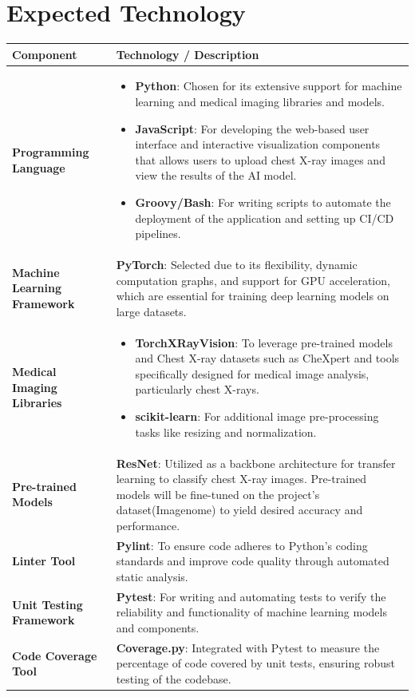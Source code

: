\documentclass{article}
\begin{document}
\section{Expected Technology}
\renewcommand{\arraystretch}{1.5} 
\begin{table}[h!]
    \centering
    \begin{tabularx}{\textwidth}{| >{\raggedright\arraybackslash}m{3.5cm} | >{\raggedright\arraybackslash}X |}
        \hline
        \textbf{Component} & \textbf{Technology / Description} \\ \hline
        \textbf{Programming Language} & \begin{itemize}
          \item \textbf{Python}: Chosen for its extensive support for machine learning and medical imaging libraries and models.
          \item \textbf{JavaScript}: For developing the web-based user interface and interactive visualization components that allows users to upload chest X-ray images and view the results of the AI model.
          \item \textbf{Groovy/Bash}: For writing scripts to automate the deployment of the application and setting up CI/CD pipelines.
      \end{itemize} \\ \hline 
        \textbf{Machine Learning Framework} & \textbf{PyTorch}: Selected due to its flexibility, dynamic computation graphs, and support for GPU acceleration, which are essential for training deep learning models on large datasets. \\ \hline
        \textbf{Medical Imaging Libraries} & \begin{itemize}
            \item \textbf{TorchXRayVision}: To leverage pre-trained models and Chest X-ray datasets such as CheXpert and tools specifically designed for medical image analysis, particularly chest X-rays. 
            \item \textbf{scikit-learn}: For additional image pre-processing tasks like resizing and normalization.
        \end{itemize} \\ \hline
        \textbf{Pre-trained Models} & \textbf{ResNet}: Utilized as a backbone architecture for transfer learning to classify chest X-ray images. Pre-trained models will be fine-tuned on the project’s dataset(Imagenome) to yield desired accuracy and performance. \\ \hline
        \textbf{Linter Tool} & \textbf{Pylint}: To ensure code adheres to Python's coding standards and improve code quality through automated static analysis. \\ \hline
        \textbf{Unit Testing Framework} & \textbf{Pytest}: For writing and automating tests to verify the reliability and functionality of machine learning models and components. \\ \hline
        \textbf{Code Coverage Tool} & \textbf{Coverage.py}: Integrated with Pytest to measure the percentage of code covered by unit tests, ensuring robust testing of the codebase. \\ \hline
        

\end{tabularx}
\end{table}
\end{document}
